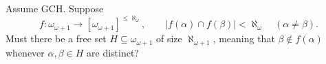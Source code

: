 Assume GCH. Suppose
\[
f:\omega_{\omega+1}\longrightarrow[\omega_{\omega+1}]^{\leq\aleph_\omega},
\qquad |f(\alpha)\cap f(\beta)|<\aleph_\omega\quad(\alpha\ne\beta).
\]
Must there be a free set $H\subseteq\omega_{\omega+1}$ of size $\aleph_{\omega+1}$, meaning that $\beta\notin f(\alpha)$ whenever $\alpha,\beta\in H$ are distinct?
